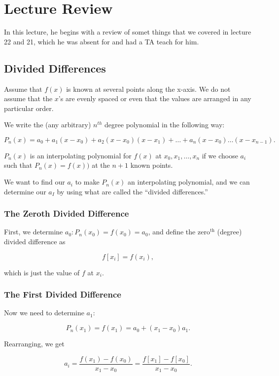 \section*{Lecture Review}

In this lecture, he begins with a review of somet things that we covered in
lecture 22 and 21, which he was absent for and had a TA teach for him.

\subsection{Divided Differences}

Assume that $f(x)$ is known at several points along the x-axis. We do not assume
that the $x$'s are evenly spaced or even that the values are arranged in any
particular order.

We write the (any arbitrary) $n^{th}$ degree polynomial in the following way:

\[
  P_n(x) = a_0 + a_1 (x-x_0) + a_2 (x-x_0) (x-x_1) + \dots + a_n (x-x_0) \dots (x-x_{n-1})
.\]

 $P_n(x)$ is an interpolating polynomial for $f(x)$ at $x_0, x_1, \dots, x_n$
if we choose $a_i$ such that $P_n(x) = f(x))$ at the $n+1$ known points.

We want to find our $a_i$ to make $P_n(x)$ an interpolating polynomial, and we
can determine our $a_I$ by using what are called the \enquote{divided
differences.}

\subsubsection{The Zeroth Divided Difference}

First, we determine $a_0: P_n(x_0) = f(x_0) = a_0$, and define the
$\text{zero}^{\text{th}}$ (degree) divided difference as

\[
  f[x_i] = f(x_i)
,\]

\noindent
which is just the value of $f$ at $x_i$.

\subsubsection{The First Divided Difference}

Now we need to determine $a_1$:

\[
P_n(x_1) = f(x_1) = a_0 + (x_1 - x_0) a_1
.\]

Rearranging, we get

\[
a_i = \frac{f(x_1) - f(x_0)}{x_1 - x_0} = \frac{f[x_1] - f[x_0]}{x_1 - x_0}
.\]

